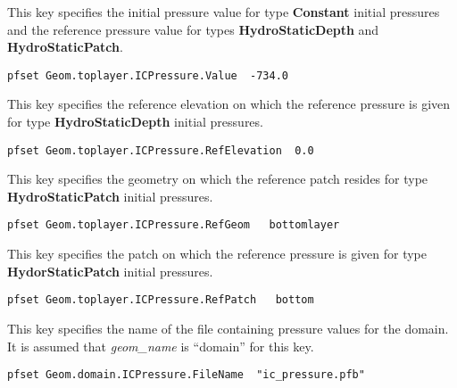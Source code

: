 {This key specifies the initial pressure value for type {\bf Constant} initial
pressures and the reference pressure value for types {\bf HydroStaticDepth} and
{\bf HydroStaticPatch}.
}
\begin{display}\begin{verbatim}
pfset Geom.toplayer.ICPressure.Value  -734.0
\end{verbatim}\end{display}

{This key specifies the reference elevation on which the reference pressure is
given for type {\bf HydroStaticDepth} initial pressures.
}
\begin{display}\begin{verbatim}
pfset Geom.toplayer.ICPressure.RefElevation  0.0
\end{verbatim}\end{display}

{This key specifies the geometry on which the reference patch resides for type
{\bf HydroStaticPatch} initial pressures.
}
\begin{display}\begin{verbatim}
pfset Geom.toplayer.ICPressure.RefGeom   bottomlayer
\end{verbatim}\end{display}

{This key specifies the patch on which the reference pressure is given for type
{\bf HydorStaticPatch} initial pressures.
}
\begin{display}\begin{verbatim}
pfset Geom.toplayer.ICPressure.RefPatch   bottom
\end{verbatim}\end{display}

{This key specifies the name of the file containing pressure values for the
domain.  It is assumed that {\em geom\_name} is ``domain'' for this key.}
\begin{display}\begin{verbatim}
pfset Geom.domain.ICPressure.FileName  "ic_pressure.pfb"
\end{verbatim}\end{display}


